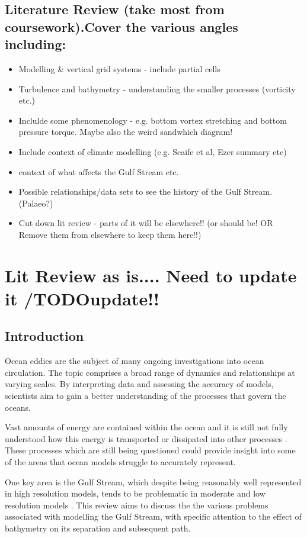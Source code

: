 \documentclass[a4paper,11pt]{article}
\begin{document}
\subsection{Literature Review (take most from coursework).Cover the various angles including:}
\begin{itemize}
  \item Modelling \& vertical grid systems - include partial cells
  \item Turbulence and bathymetry - understanding the smaller processes (vorticity etc.) \citep{Tansley2001} \citep{Nikurashin2012a}
  \item Inclulde some phenomenology - e.g. bottom vortex stretching and bottom pressure torque. Maybe also the weird sandwhich diagram!
  \item Include context of climate modelling (e.g. Scaife et al, Ezer summary etc)
  \item context of what affects the Gulf Stream etc.
  \item Possible relationships/data sets to see the history of the Gulf Stream. (Palaeo?) \citep{Ezer2015}
  \item Cut down lit review - parts of it will be elsewhere!! (or should be! OR Remove them from elsewhere to keep them here!!)
\end{itemize}


\section{Lit Review as is.... Need to update it /TODO{update!!}}

\subsection{Introduction}
Ocean eddies are the subject of many ongoing investigations into ocean circulation. The topic comprises a broad range of dynamics and relationships at varying scales. By interpreting data and assessing the accuracy of models, scientists aim to gain a better understanding of the processes that govern the oceans.

Vast amounts of energy are contained within the ocean and it is still not fully understood how this energy is transported or dissipated into other processes \citep{Nikurashin2012a}. These processes which are still being questioned could provide insight into some of the areas that ocean models struggle to accurately represent.

One key area is the Gulf Stream, which despite being reasonably well represented in high resolution models, tends to be problematic in moderate and low resolution models \citep{Zhang2007}. This review aims to discuss the the various problems associated with modelling the Gulf Stream, with specific attention to the effect of bathymetry on its separation and subsequent path.
\end{document}
